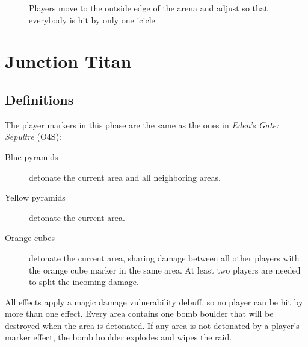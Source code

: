 \documentclass{report}
\begin{document}
\begin{figure}[h!]
    \caption{Players move to the outside edge of the arena and adjust so that everybody is hit by only one icicle}
    \label{resolve}
\end{figure}

\chapter{Junction Titan}
\section{Definitions}

The player markers in this phase are the same as the ones in \emph{Eden's Gate: Sepultre} (O4S):

\begin{description}
    \item [Blue pyramids] detonate the current area and all neighboring areas.
    \item [Yellow pyramids] detonate the current area.
    \item [Orange cubes] detonate the current area, sharing damage between all other players with the orange cube marker in the same area.  At least two players are needed to split the incoming damage.
\end{description}

All effects apply a magic damage vulnerability debuff, so no player can be hit by more than one effect.
Every area contains one bomb boulder that will be destroyed when the area is detonated.  If any area is not detonated by a player's marker effect, the bomb boulder explodes and wipes the raid.
\end{document}
